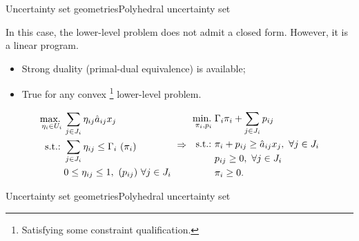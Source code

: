 \begin{frame}{Uncertainty set geometries}{Polyhedral uncertainty set \cite{bertsimas2004price}}

	In this case, the lower-level problem does not admit a closed form.  However, it is a \alert{linear program}. 
	\vspace{-6pt}
	\begin{itemize}
		\item Strong duality (primal-dual equivalence) is available;
		\item True for any \alert{convex}%
		\footnote{Satisfying some constraint qualification.}
		 lower-level problem.	
	\end{itemize}
	\pause
	\begin{equation*}
		\begin{split}
			\mathop{\text{max.} \ }_{\eta_i \in U_i} & \sum_{j \in J_i} \eta_{ij} \hat{a}_{ij}x_j \\
			 \mathop{\text{s.t.:} \ } & \sum_{j \in J_i} \eta_{ij} \le \Gamma_i \ (\pi_i) \\
			 & 0 \le \eta_{ij} \le 1, \ (p_{ij}) \ \forall j \in J_i
		\end{split}
		\ \Rightarrow \
		\begin{split}
			\mathop{\text{min.} \ }_{\pi_i, p_i} & \Gamma_i\pi_i + \sum_{j \in J_i} p_{ij} \\
			 \mathop{\text{s.t.:} \ } & \pi_i + p_{ij} \ge \hat{a}_{ij}x_j, \ \forall j \in J_i \\
			 &p_{ij} \ge 0, \ \forall j \in J_i \\
			 &\pi_i \ge 0.
		\end{split}
	\end{equation*}
	
\end{frame}


\begin{frame}{Uncertainty set geometries}{Polyhedral uncertainty set \cite{bertsimas2004price}}

	\centering

\end{frame}



